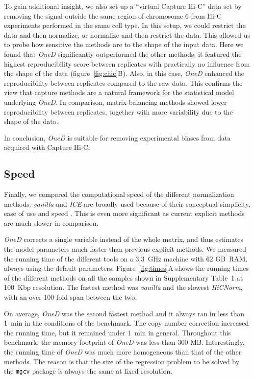 \documentclass[a4,center,fleqn]{NAR}
\begin{document}
To gain additional insight, we also set up a ``virtual Capture Hi-C'' data
set by removing the signal outside the same region of chromosome 6 from
Hi-C experiments performed in the same cell type. In this setup, we could
restrict the data and then normalize, or normalize and then restrict the
data. This allowed us to probe how sensitive the methods are to the shape
of the input data. Here we found that \textit{OneD} significantly
outperformed the other methods: it featured the highest reproducibility
score between replicates with practically no influence from the shape of
the data (figure~\ref{fig:chic}B). Also, in this case, \textit{OneD}
enhanced the reproducibility between replicates compared to the raw data.
This confirms the view that capture methods are a natural framework for
the statistical model underlying \textit{OneD}. In comparison,
matrix-balancing methods showed lower reproducibility between replicates,
together with more variability due to the shape of the data.

In conclusion, \textit{OneD} is suitable for removing experimental biases
from data acquired with Capture Hi-C.

\subsection{Speed}

Finally, we compared the computational speed of the different
normalization methods. \textit{vanilla} and \textit{ICE} are broadly used
because of their conceptual simplicity, ease of use and speed
\citep{imakaev2012iterative}. This is even more significant as current
explicit methods \citep{servant2012hitc} are much slower in comparison.

\textit{OneD} corrects a single variable instead of the whole matrix, and
thus estimates the model parameters much faster than previous explicit
methods. We measured the running time of the different tools on a 3.3~GHz
machine with 62 GB~RAM, always using the default parameters.
Figure~\ref{fig:times}A shows the running times of the different methods
on all the samples shown in Supplementary Table~1 at 100~Kbp resolution.
The fastest method was \textit{vanilla} and the slowest \textit{HiCNorm}, with
an over 100-fold span between the two.

On average, \textit{OneD} was the second fastest method and it always ran in less than
1~min in the conditions of the benchmark. The copy number correction
increased the running time, but it remained under 1~min in general.
Throughout this benchmark, the memory footprint of \textit{OneD} was less
than 300 MB.  Interestingly, the running time of \textit{OneD} was much
more homogeneous than that of the other methods. The reason is that the
size of the regression problem to be solved by the \texttt{mgcv} package
is always the same at fixed resolution.
\end{document}
